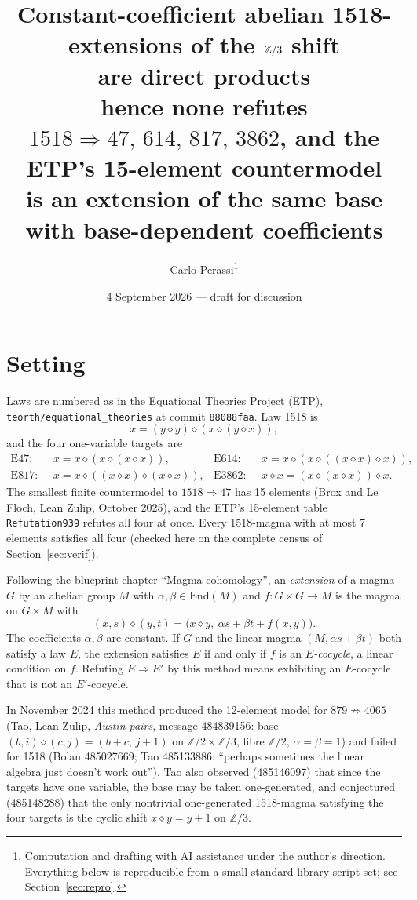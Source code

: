 \documentclass[11pt]{article}
\title{Constant-coefficient abelian 1518-extensions of the $\Z/3$ shift\\are direct products\\[2mm]\large hence none refutes $1518 \Rightarrow 47,\,614,\,817,\,3862$, and the ETP's 15-element countermodel\\[1mm]\large is an extension of the same base with base-dependent coefficients}
\author{Carlo Perassi\thanks{Computation and drafting with AI assistance under the author's direction. Everything below is reproducible from a small standard-library script set; see Section~\ref{sec:repro}.}}
\date{4 September 2026 --- draft for discussion}
\theoremstyle{remark}\newtheorem*{remark}{Remark}
\newcommand{\op}{\diamond}
\newcommand{\Z}{\mathbb{Z}}
\newcommand{\End}{\mathrm{End}}
\newcommand{\Eq}[1]{\mathrm{E}#1}
\begin{document}
\maketitle

\section{Setting}

Laws are numbered as in the Equational Theories Project (ETP), \texttt{teorth/equational\_theories} at commit \texttt{88088faa}. Law 1518 is
\[
x = (y \op y) \op (x \op (y \op x)),
\]
and the four one-variable targets are
\begin{align*}
\Eq{47}:&\ \ x = x \op (x \op (x \op x)), &
\Eq{614}:&\ \ x = x \op (x \op ((x \op x) \op x)),\\
\Eq{817}:&\ \ x = x \op ((x \op x) \op (x \op x)), &
\Eq{3862}:&\ \ x \op x = (x \op (x \op x)) \op x .
\end{align*}
The smallest finite countermodel to $1518\Rightarrow47$ has 15 elements (Brox and Le Floch, Lean Zulip, October 2025), and the ETP's 15-element table \texttt{Refutation939} refutes all four at once. Every 1518-magma with at most 7 elements satisfies all four (checked here on the complete census of Section~\ref{sec:verif}).

Following the blueprint chapter ``Magma cohomology'', an \emph{extension} of a magma $G$ by an abelian group $M$ with $\alpha,\beta \in \End(M)$ and $f\colon G\times G\to M$ is the magma on $G\times M$ with
\begin{equation}\label{eq:ext}
(x,s)\op(y,t) = \bigl(x\op y,\ \alpha s+\beta t+f(x,y)\bigr).
\end{equation}
The coefficients $\alpha,\beta$ are constant. If $G$ and the linear magma $(M, \alpha s+\beta t)$ both satisfy a law $E$, the extension satisfies $E$ if and only if $f$ is an \emph{$E$-cocycle}, a linear condition on $f$. Refuting $E\Rightarrow E'$ by this method means exhibiting an $E$-cocycle that is not an $E'$-cocycle.

In November 2024 this method produced the 12-element model for $879 \not\Rightarrow 4065$ (Tao, Lean Zulip, \emph{Austin pairs}, message 484839156: base $(b,i)\op(c,j)=(b+c,\,j+1)$ on $\Z/2\times\Z/3$, fibre $\Z/2$, $\alpha=\beta=1$) and failed for 1518 (Bolan 485027669; Tao 485133886: ``perhaps sometimes the linear algebra just doesn't work out''). Tao also observed (485146097) that since the targets have one variable, the base may be taken one-generated, and conjectured (485148288) that the only nontrivial one-generated 1518-magma satisfying the four targets is the cyclic shift $x\op y=y+1$ on $\Z/3$.
\end{document}
